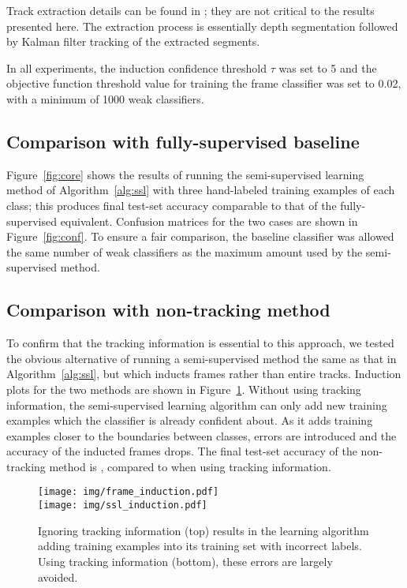 \documentclass[conference]{IEEEtran}
\begin{document}
Track extraction details can be found in \cite{Teichman2011}; they are not critical to the results presented here.  The extraction process is essentially depth segmentation followed by Kalman filter tracking of the extracted segments.

In all experiments, the induction confidence threshold $\tau$ was set to 5 and the objective function threshold value for training the frame classifier was set to 0.02, with a minimum of 1000 weak classifiers.

\subsection{Comparison with fully-supervised baseline}
\label{sec:core}
Figure~\ref{fig:core} shows the results of running the semi-supervised learning method of Algorithm~\ref{alg:ssl} with three hand-labeled training examples of each class; this produces final test-set accuracy comparable to that of the fully-supervised equivalent.  Confusion matrices for the two cases are shown in Figure~\ref{fig:conf}.  To ensure a fair comparison, the baseline classifier was allowed the same number of weak classifiers as the maximum amount used by the semi-supervised method.


\subsection{Comparison with non-tracking method}

To confirm that the tracking information is essential to this approach, we tested the obvious alternative of running a semi-supervised method the same as that in Algorithm~\ref{alg:ssl}, but which inducts frames rather than entire tracks.  Induction plots for the two methods are shown in Figure~\ref{fig:tracking_vs_not}.  Without using tracking information, the semi-supervised learning algorithm can only add new training examples which the classifier is already confident about.  As it adds training examples closer to the boundaries between classes, errors are introduced and the accuracy of the inducted frames drops.  The final test-set accuracy of the non-tracking method is , compared to  when using tracking information.

\begin{figure}
  \centering
  \texttt{[image: img/frame\_induction.pdf]} \\
  \vspace{0.1in}
  \texttt{[image: img/ssl\_induction.pdf]}
  \caption{Ignoring tracking information (top) results in the learning algorithm adding training examples into its training set with incorrect labels.  Using tracking information (bottom), these errors are largely avoided.}
  \label{fig:tracking_vs_not}
\end{figure}
\end{document}
